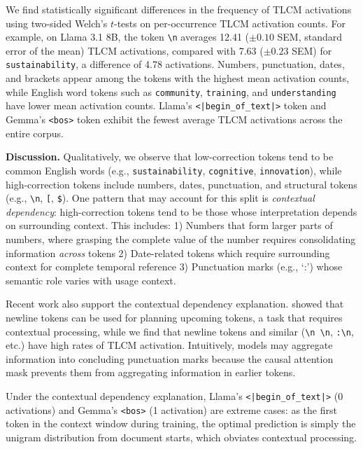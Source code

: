 We find statistically significant differences in the frequency of TLCM activations using two-sided Welch's $t$-tests on per-occurrence TLCM activation counts. For example, on Llama 3.1 8B, the token \texttt{\textbackslash n} averages 12.41 ($\pm 0.10$ SEM, standard error of the mean) TLCM activations, compared with 7.63 ($\pm 0.23$ SEM) for \texttt{sustainability}, a difference of 4.78 activations. Numbers, punctuation, dates, and brackets appear among the tokens with the highest mean activation counts, while English word tokens such as \texttt{community}, \texttt{training}, and \texttt{understanding} have lower mean activation counts. Llama's \texttt{<|begin\_of\_text|>} token and Gemma's \texttt{<bos>} token exhibit the fewest average TLCM activations across the entire corpus.

\textbf{Discussion.} Qualitatively, we observe that low-correction tokens tend to be common English words (e.g., \texttt{sustainability}, \texttt{cognitive}, \texttt{innovation}), while high-correction tokens include numbers, dates, punctuation, and structural tokens (e.g., \texttt{\textbackslash n}, \texttt{[}, \texttt{\$}). One pattern that may account for this split is \textit{contextual dependency}: high-correction tokens tend to be those whose interpretation depends on surrounding context. This includes: 1) Numbers that form larger parts of numbers, where grasping the complete value of the number requires consolidating information \textit{across} tokens 2) Date-related tokens which require surrounding context for complete temporal reference 3) Punctuation marks (e.g., `:') whose semantic role varies with usage context.

Recent work also support the contextual dependency explanation. \citet{lindsey2025biology} showed that newline tokens can be used for planning upcoming tokens, a task that requires contextual processing, while we find that newline tokens and similar (\texttt{\textbackslash n \textbackslash n}, \texttt{:\textbackslash n}, etc.) have high rates of TLCM activation. Intuitively, models may aggregate information into concluding punctuation marks because the causal attention mask prevents them from aggregating information in earlier tokens.

Under the contextual dependency explanation, Llama's \texttt{<|begin\_of\_text|>} (0 activations) and Gemma's \texttt{<bos>} (1 activation) are extreme cases: as the first token in the context window during training, the optimal prediction is simply the unigram distribution from document starts, which obviates contextual processing.

